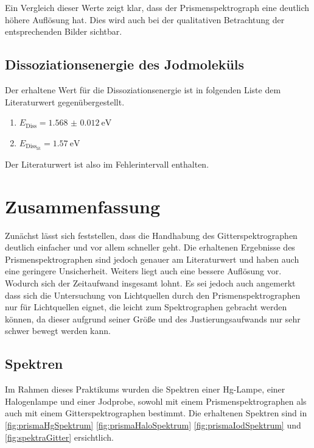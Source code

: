 \documentclass[12pt,english,ngerman]{scrartcl}
\begin{document}
Ein Vergleich dieser Werte zeigt klar, dass der Prismenspektrograph eine
deutlich höhere Auflösung hat. Dies wird auch bei der qualitativen Betrachtung
der entsprechenden Bilder sichtbar.

\subsection{Dissoziationsenergie des Jodmoleküls}

Der erhaltene Wert für die Dissoziationsenergie ist in folgenden Liste dem
Literaturwert gegenübergestellt.

\begin{enumerate}
	\item $E_\text{Diss} = \SI{1.568(12)}{\electronvolt}$
	\item $E_{\text{Diss}_\text{lit}} = \SI{1.57}{\electronvolt}$
\end{enumerate}

Der Literaturwert ist also im Fehlerintervall enthalten.


\section{Zusammenfassung}\label{sec:zs}
Zunächst lässt sich feststellen, dass die Handhabung des Gitterspektrographen
deutlich einfacher und vor allem schneller geht. Die erhaltenen Ergebnisse des
Prismenspektrographen sind jedoch genauer am Literaturwert und haben auch eine
geringere Unsicherheit. Weiters liegt auch eine bessere Auflösung vor. Wodurch
sich der Zeitaufwand insgesamt lohnt. Es sei jedoch auch angemerkt dass sich
die Untersuchung von Lichtquellen durch den Prismenspektrographen nur für
Lichtquellen eignet, die leicht zum Spektrographen gebracht werden können, da
dieser aufgrund seiner Größe und des Justierungsaufwands nur sehr schwer bewegt
werden kann.

\subsection{Spektren}

Im Rahmen dieses Praktikums wurden die Spektren einer Hg-Lampe, einer
Halogenlampe und einer Jodprobe, sowohl mit einem Prismenspektrographen als
auch mit einem Gitterspektrographen bestimmt. Die erhaltenen Spektren sind in
 \autoref{fig:prismaHgSpektrum} \autoref{fig:prismaHaloSpektrum}
\autoref{fig:prismaIodSpektrum} und \autoref{fig:spektraGitter} ersichtlich.
\end{document}
